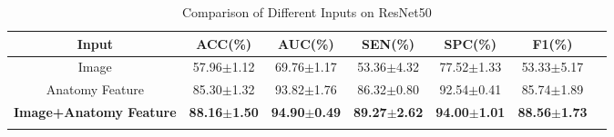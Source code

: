 \documentclass[journal]{IEEEtran}
\begin{document}
\begin{table*}[ht]
\centering
\renewcommand\arraystretch{1.2}
\setlength{\tabcolsep}{5mm}
\caption{Comparison of Different Inputs on ResNet50}
\begin{tabular}{c|cccccc}
\Xhline{1pt}
Input     & ACC(\%)&AUC(\%) & SEN(\%) & SPC(\%) & F1(\%)   \\ \hline
Image    & 57.96$\pm$1.12  & 69.76$\pm$1.17 & 53.36$\pm$4.32  & 77.52$\pm$1.33  & 53.33$\pm$5.17 \\ \hline
Anatomy Feature & 85.30$\pm$1.32 & 93.82$\pm$1.76   & 86.32$\pm$0.80   & 92.54$\pm$0.41   & 85.74$\pm$1.89 \\ \hline
\textbf{Image+Anatomy Feature}   & \textbf{88.16$\pm$1.50}      & \textbf{94.90$\pm$0.49}       & \textbf{89.27$\pm$2.62}     & \textbf{94.00$\pm$1.01}    & \textbf{88.56$\pm$1.73}      \\ \Xhline{1pt}
\end{tabular}
\label{tab4}
\end{table*}
\end{document}
